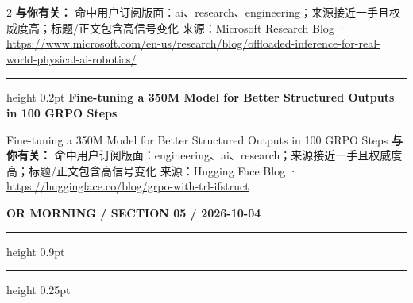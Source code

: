 \documentclass[10.5pt]{ctexart}
\begin{document}
\begin{multicols}{2}
\textbf{与你有关：} 命中用户订阅版面：ai、research、engineering；来源接近一手且权威度高；标题/正文包含高信号变化
{\footnotesize\color{ormuted} 来源：Microsoft Research Blog · \url{https://www.microsoft.com/en-us/research/blog/offloaded-inference-for-real-world-physical-ai-robotics/}}
\vspace{2mm}
\hrule height 0.2pt
\vspace{2mm}
{\large\bfseries Fine-tuning a 350M Model for Better Structured Outputs in 100 GRPO Steps}\par
Fine-tuning a 350M Model for Better Structured Outputs in 100 GRPO Steps
\textbf{与你有关：} 命中用户订阅版面：engineering、ai、research；来源接近一手且权威度高；标题/正文包含高信号变化
{\footnotesize\color{ormuted} 来源：Hugging Face Blog · \url{https://huggingface.co/blog/grpo-with-trl-ifstruct}}
\end{multicols}
\newpage
{\small\bfseries OR MORNING / SECTION 05 / 2026-10-04}
\vspace{2mm}
\hrule height 0.9pt
\vspace{1.5mm}
\hrule height 0.25pt
\vspace{4mm}
\end{document}
